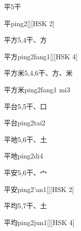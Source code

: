 \begin{entry}{平}{5}{⼲}
  \begin{phonetics}{平}{ping2}[][HSK 2]
  \end{phonetics}
\end{entry}

\begin{entry}{平方}{5,4}{⼲、⽅}
  \begin{phonetics}{平方}{ping2fang1}[][HSK 4]
  \end{phonetics}
\end{entry}

\begin{entry}{平方米}{5,4,6}{⼲、⽅、⽶}
  \begin{phonetics}{平方米}{ping2fang1 mi3}
  \end{phonetics}
\end{entry}

\begin{entry}{平台}{5,5}{⼲、⼝}
  \begin{phonetics}{平台}{ping2tai2}
  \end{phonetics}
\end{entry}

\begin{entry}{平地}{5,6}{⼲、⼟}
  \begin{phonetics}{平地}{ping2di4}
  \end{phonetics}
\end{entry}

\begin{entry}{平安}{5,6}{⼲、⼧}
  \begin{phonetics}{平安}{ping2'an1}[][HSK 2]
  \end{phonetics}
\end{entry}

\begin{entry}{平均}{5,7}{⼲、⼟}
  \begin{phonetics}{平均}{ping2jun1}[][HSK 4]
  \end{phonetics}
\end{entry}

